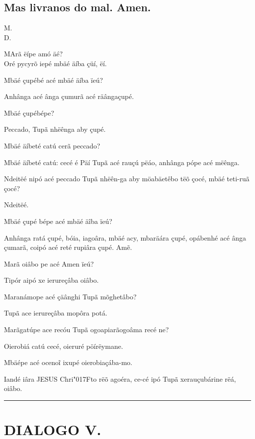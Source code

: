 \documentclass[openany,titlepage,12pt]{book}
\newcommand{\lgS}{\char"017F}
\newcommand{\comecalista}[5]{
    \hspace*{-11.7pt}
    \begin{minipage}[t]{0.08\linewidth}
        \flushright #1\\#2
    \end{minipage}
    \hspace{0pt}
    \begin{minipage}[t]{0.94\linewidth}
        \lettrine
        [findent =2pt, nindent=0pt,  lines=2]
        {#3}{#4}#5
    \end{minipage}
    \vspace*{-3pt}
}
\begin{document}
\subsection{Mas livranos do mal. Amen.}

\comecalista{M.}{D.}{M}{A}
{rã ëípe amó äé?\\ Oré pycyrõ iepé mbäé äíba çüí, ëí.}
\begin{alternate}
    \item Mbäé çupébé acé mbäé äíba ïeú?
    \item Anhânga acé ânga çumurã acé räânga\linebreak çupé.
    \item Mbäé çupébépe?
    \item Peccado, Tupã nhëênga aby çupé.
    \item Mbäé äíbeté catú cerã peccado?
    \item Mbäé äíbeté catú: cecé é Päí Tupã acé rauçú pëáo,
    anhânga pópe acé mëênga.
    \item Ndeitëé nipó acé peccado Tupã nhëên-ga aby möabäetêbo
    tëõ çocé, mbäé teti-ruã çocé?
    \item Ndeitëé.
    \item Mbäé çupé bépe acé mbäé äîba ïeú?
    \item Anhânga ratá çupé, bóia, iagoâra, mbäé acy,
    mbaräára çupé, opábenhé acé ânga çumarã, coipó acé reté
    rupiâra çupé. Amẽ.
    \item Marã oiâbo pe acé Amen ïeú?
    \item Tipór aipó xe ierureçâba oiâbo.
    \item Maranámope acé çäânghi Tupã mõghetâbo?
    \item Tupã ace ierureçâba mopôra potá.
    \item Marãgatúpe ace recóu Tupã ogoapiarãogoâma recé ne?
    \item Oierobiá catú cecé, oieruré pöírëymane.
    \item Mbäépe acé ocenoĩ ixupé oierobiaçába-mo.
    \item Iandé iâra JESUS Chri\lgS to rëõ agoéra, ce-cé
    ipó Tupã xerauçubárine rëá, oiâbo. 
\end{alternate}

\vspace{6pt}
\par\noindent\rule{\textwidth}{0.4pt}
\unskip\vspace*{6pt}
\section{DIALOGO V.}
\end{document}
